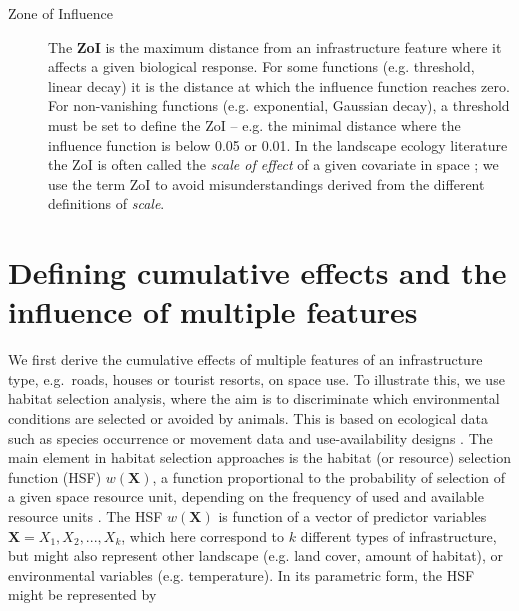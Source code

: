 \documentclass[titlepage]{article}
\begin{document}
{\begin{tcolorbox}[width=1.3\textwidth,center,colback=yellow!5,colframe=yellow!75!black,title={Box 1 -- Definitions}]
\begin{description}
    \item[Zone of Influence] The \textbf{ZoI} is the maximum distance from an infrastructure feature where it affects a given biological response. For some functions (e.g. threshold, linear decay) it is the distance at which the influence function reaches zero. For non-vanishing functions (e.g. exponential, Gaussian decay), a threshold must be set to define the ZoI -- e.g. the minimal distance where the influence function is below 0.05 or 0.01. 
    In the landscape ecology literature the ZoI is often called the \textit{scale of effect} of a given covariate in space \citep[e.g.][]{jackson_are_2015}; we use the term ZoI to avoid misunderstandings derived from the different definitions of \textit{scale}. 
    

\end{description}
\end{tcolorbox}

\section{Defining cumulative effects and the influence of multiple features}

We first derive the cumulative effects of multiple features of an infrastructure type, e.g.\ roads, houses or tourist resorts, on space use. To illustrate this, we use habitat selection analysis, where the aim is to discriminate which environmental conditions are selected or avoided by animals. This is based on ecological data such as species occurrence or movement data and use-availability designs \citep{fieberg_how_2021}. The main element in habitat selection approaches is the habitat (or resource) selection function (HSF) $w(\textbf{X})$, a function proportional to the probability of selection of a given space resource unit, depending on the frequency of used and available resource units \citep{thurfjell_applications_2014}. The HSF $w(\textbf{X})$ is function of a vector of predictor variables $\textbf{X} = X_1,X_2, ...,  X_k$, which here correspond to $k$ different types of infrastructure, but might also represent other landscape (e.g. land cover, amount of habitat), or environmental variables (e.g. temperature). In its parametric form, the HSF might be represented by

}
\end{document}
